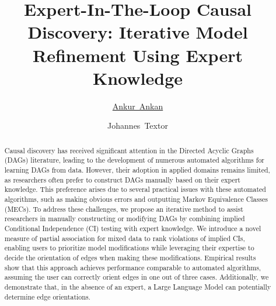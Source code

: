 \documentclass{uai2025} %
\title{Expert-In-The-Loop Causal Discovery: Iterative Model Refinement Using Expert Knowledge}
\author[1]{\href{mailto:<ankur.ankan@ru.nl>?Subject=Your UAI 2025 paper}{Ankur~Ankan}{}}
\author[1]{Johannes~Textor}
\affil[1]{%
    Institute for Computing and Information Sciences\\
    Radboud University\\
    Nijmegen, The Netherlands
}
\begin{document}
\maketitle

\begin{abstract}

Causal discovery has received significant attention in the Directed Acyclic
Graphs (DAGs) literature, leading to the development of numerous automated
algorithms for learning DAGs from data. However, their adoption in applied
domains remains limited, as researchers often prefer to construct DAGs manually
based on their expert knowledge. This preference arises due to several
practical issues with these automated algorithms, such as making obvious errors
and outputting Markov Equivalence Classes (MECs). To address these challenges,
we propose an iterative method to assist researchers in manually constructing
or modifying DAGs by combining implied Conditional Independence (CI) testing
with expert knowledge. We introduce a novel measure of partial association for
mixed data to rank violations of implied CIs, enabling users to prioritize
model modifications while leveraging their expertise to decide the orientation
of edges when making these modifications. Empirical results show that this
approach achieves performance comparable to automated algorithms, assuming the
user can correctly orient edges in one out of three cases. Additionally, we
demonstrate that, in the absence of an expert, a Large Language Model can
potentially determine edge orientations.

\end{abstract}
\end{document}
